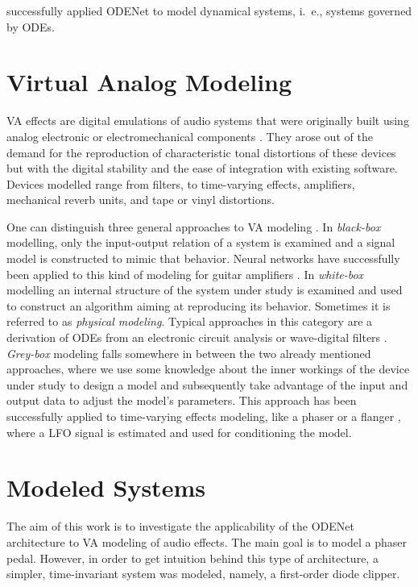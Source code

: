 \cite{Karlsson2019} successfully applied ODENet to model dynamical systems, i.\ e., systems governed by \acp{ODE}. 

\section{Virtual Analog Modeling}
\label{sec:virtual_analog_modeling}
\Ac{VA} effects are digital emulations of audio systems that were originally built using analog electronic or electromechanical components \cite{Zoelzer2011}. They arose out of the demand for the reproduction of characteristic tonal distortions of these devices but with the digital stability and the ease of integration with existing software. Devices modelled range from filters, to time-varying effects, amplifiers, mechanical reverb units, and tape or vinyl distortions.

One can distinguish three general approaches to \ac{VA} modeling \cite{Kiiski2016,Wright2020}. In \emph{black-box} modelling, only the input-output relation of a system is examined and a signal model is constructed to mimic that behavior. Neural networks have successfully been applied to this kind of modeling for guitar amplifiers \cite{Wright2019,Wrightetal2020}. In \emph{white-box} modelling an internal structure of the system under study is examined and used to construct an algorithm aiming at reproducing its behavior. Sometimes it is referred to as \emph{physical modeling}. Typical approaches in this category are a derivation of \acp{ODE} from an electronic circuit analysis \cite{Yeh2007,Eichas2014} or wave-digital filters \cite{PASPWEB2010}. \emph{Grey-box} modeling falls somewhere in between the two already mentioned approaches, where we use some knowledge about the inner workings of the device under study to design a model and subsequently take advantage of the input and output data to adjust the model's parameters. This approach has been successfully applied to time-varying effects modeling, like a phaser or a flanger \cite{Kiiski2016,Wright2020}, where a \ac{LFO} signal is estimated and used for conditioning the model.


\section{Modeled Systems}
\label{sec:modeled_systems}
The aim of this work is to investigate the applicability of the ODENet architecture to \ac{VA} modeling of audio effects. The main goal is to model a phaser pedal. However, in order to get intuition behind this type of architecture, a simpler, time-invariant system was modeled, namely, a first-order diode clipper. 

